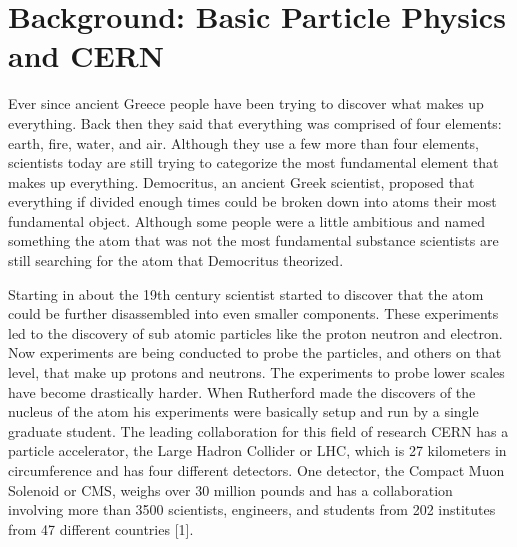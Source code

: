 \documentclass
[]
{thesis}
\begin{document}
	
\chapter{Background: Basic Particle Physics and CERN}
\label{chap:one}
	
Ever since ancient Greece people have been trying to discover what makes up everything. Back then they said that everything was comprised of four elements: earth, fire, water, and air. Although they use a few more than four elements, scientists today are still trying to categorize the most fundamental element that makes up everything. Democritus, an ancient Greek scientist, proposed that everything if divided enough times could be broken down into atoms their most fundamental object. Although some people were a little ambitious and named something the atom that was not the most fundamental substance scientists are still searching for the atom that Democritus theorized. 

Starting in about the 19th century scientist started to discover that the atom could be further disassembled into even smaller components. These experiments led to the discovery of sub atomic particles like the proton neutron and electron. Now experiments are being conducted to probe the particles, and others on that level, that make up protons and neutrons. The experiments to probe lower scales have become drastically harder. When Rutherford made the discovers of the nucleus of the atom his experiments were basically setup and run by a single graduate student. The leading collaboration for this field of research CERN has a particle accelerator, the Large Hadron Collider or LHC, which is 27 kilometers in circumference and has four different detectors. One detector, the Compact Muon Solenoid or CMS, weighs over 30 million pounds and has a collaboration involving more than 3500 scientists, engineers, and students from 202 institutes from 47 different countries [1]. 
\end{document}
